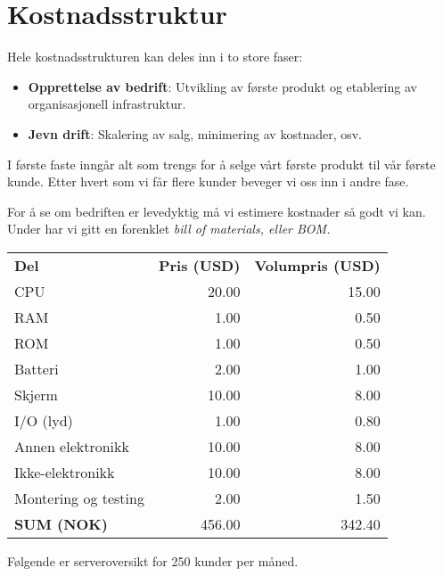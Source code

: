 \section{Kostnadsstruktur}

Hele kostnadsstrukturen kan deles inn i to store faser:

\begin{itemize}
  \item \textbf{Opprettelse av bedrift}: Utvikling av første produkt og etablering av
  organisasjonell infrastruktur.
  \item \textbf{Jevn drift}: Skalering av salg, minimering av kostnader, osv.
\end{itemize}

I første faste inngår alt som trengs for å selge vårt første produkt til vår
første kunde. Etter hvert som vi får flere kunder beveger vi oss inn i andre
fase.

For å se om bedriften er levedyktig må vi estimere kostnader så godt vi kan.
Under har vi gitt en forenklet \em{bill of materials}, eller \em{BOM}.

\begin{table}[h]
\begin{tabular}{lrr}
\textbf{Del}         & \textbf{Pris (USD)} & \textbf{Volumpris (USD)} \\
CPU                  & 20.00         &   15.00 \\
RAM                  &  1.00         &    0.50 \\
ROM                  &  1.00         &    0.50 \\
Batteri              &  2.00         &    1.00 \\
Skjerm               & 10.00         &    8.00 \\
I/O (lyd)            &  1.00         &    0.80 \\
Annen elektronikk    & 10.00         &    8.00 \\
Ikke-elektronikk     & 10.00         &    8.00 \\
Montering og testing &  2.00         &    1.50 \\
\textbf{SUM (NOK)}   & 456.00        &  342.40 \\
\end{tabular}
\end{table}

Følgende er serveroversikt for 250 kunder per måned.

